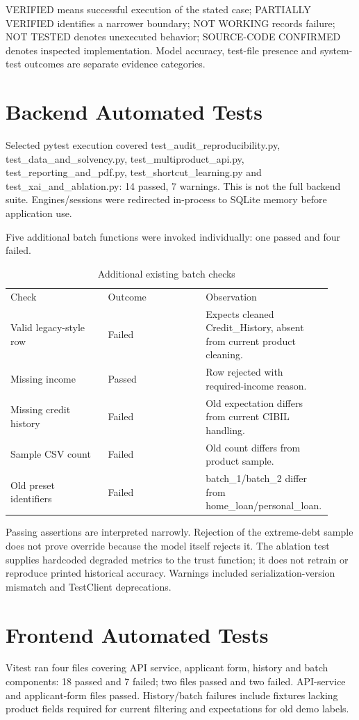 \documentclass[12pt,a4paper]{report}
\begin{document}
VERIFIED means successful execution of the stated case; PARTIALLY VERIFIED identifies a narrower boundary; NOT WORKING records failure; NOT TESTED denotes unexecuted behavior; SOURCE-CODE CONFIRMED denotes inspected implementation. Model accuracy, test-file presence and system-test outcomes are separate evidence categories.

\section{Backend Automated Tests}
Selected pytest execution covered test\_audit\_reproducibility.py, test\_data\_and\_solvency.py, test\_multiproduct\_api.py, test\_reporting\_and\_pdf.py, test\_shortcut\_learning.py and test\_xai\_and\_ablation.py: 14 passed, 7 warnings. This is not the full backend suite. Engines/sessions were redirected in-process to SQLite memory before application use.

Five additional batch functions were invoked individually: one passed and four failed.

\begin{longtable}{p{0.307\linewidth}p{0.307\linewidth}p{0.307\linewidth}}
\caption{Additional existing batch checks}\\

Check & Outcome & Observation\\
Valid legacy-style row & Failed & Expects cleaned Credit\_History, absent from current product cleaning.\\
Missing income & Passed & Row rejected with required-income reason.\\
Missing credit history & Failed & Old expectation differs from current CIBIL handling.\\
Sample CSV count & Failed & Old count differs from product sample.\\
Old preset identifiers & Failed & batch\_1/batch\_2 differ from home\_loan/personal\_loan.\\
\end{longtable}
Passing assertions are interpreted narrowly. Rejection of the extreme-debt sample does not prove override because the model itself rejects it. The ablation test supplies hardcoded degraded metrics to the trust function; it does not retrain or reproduce printed historical accuracy. Warnings included serialization-version mismatch and TestClient deprecations.

\section{Frontend Automated Tests}
Vitest ran four files covering API service, applicant form, history and batch components: 18 passed and 7 failed; two files passed and two failed. API-service and applicant-form files passed. History/batch failures include fixtures lacking product fields required for current filtering and expectations for old demo labels.
\end{document}
